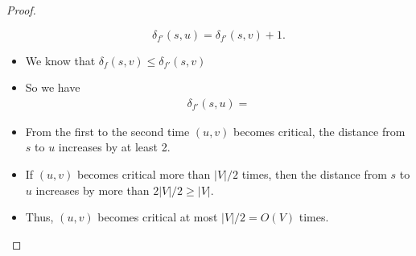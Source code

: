 \documentclass[11  pt]{article}
\begin{document}
\begin{proof}
\begin{itemize}
		\begin{equation*}
			\delta_{f'}(s,u) = \delta_{f'}(s,v) + 1.
		\end{equation*}
		
		
		\item We know that $\delta_f(s,v) \leq \delta_{f'}(s,v)$ \\ %
		
		\item So we have
		\begin{align*}
			\delta_{f'}(s,u) =  %
		\end{align*}
		
		\item From the first to the second time $(u,v)$ becomes critical, the distance from $s$ to $u$ increases by at least 2.\\
		
		
		\item If $(u,v)$ becomes critical more than $|V|/2$ times, then the distance from $s$ to $u$ increases by more than $2 |V|/2 \geq |V|$.\\
		
		\vs{2cm}
		
		\item Thus, $(u,v)$ becomes critical at most $|V|/2 = O(V)$ times.
	\end{itemize}
\end{proof}
\end{document}
